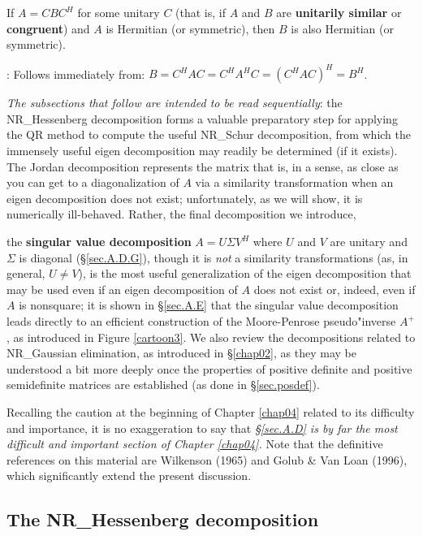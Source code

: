 \begin{fact} \label{fact.A.D.B}
If $A=CBC^{H}$ for some unitary $C$ (that is,
if $A$ and $B$ are {\bf unitarily similar} or {\bf congruent}) and $A$ is Hermitian (or
symmetric), then $B$ is also Hermitian (or symmetric).
\end{fact}

\/: Follows immediately from:
$B=C^{H}A C=C^{H}A^{H} C=(C^{H}A C)^{H}=B^{H}$. \endproof \medskip

{\it The subsections that follow are intended to be read sequentially}: the NR_Hessenberg
decomposition forms a valuable preparatory step for applying the QR
method to compute the useful NR_Schur decomposition, from which the immensely useful
eigen decomposition may readily be determined (if it exists).  The Jordan decomposition
represents the matrix that is, in a sense, as close as you can get to a diagonalization of $A$
via a similarity transformation when an eigen decomposition does not exist; unfortunately, as we will
show, it is numerically ill-behaved.  Rather, the final decomposition we introduce, 
\beginmylistb
\item the {\bf singular value decomposition} $A=U \Sigma V^H$ where $U$ and $V$ are unitary and $\Sigma$ is diagonal (\S \ref{sec.A.D.G}),
\endmylist
though it is {\it not} a similarity transformations (as, in general, $U\ne V$), is the most useful
generalization of the eigen decomposition that may be used even
if an eigen decomposition of $A$ does not exist or, indeed, even if $A$ is nonsquare;
it is shown in \S \ref{sec.A.E} that the singular value decomposition leads directly
to an efficient construction of the Moore-Penrose pseudo"inverse $A^+$, as introduced in Figure \ref{cartoon3}.
We also review the decompositions related to NR_Gaussian elimination, as introduced in \S \ref{chap02}, as they may
be understood a bit more deeply once the properties of positive definite and positive semidefinite
matrices are established (as done in \S \ref{sec.posdef}).  

Recalling the caution at the beginning of Chapter \ref{chap04} related to its difficulty and importance, it is no exaggeration to say that
{\it \S \ref{sec.A.D} is by far the most difficult and important section of Chapter \ref{chap04}.}  Note that the definitive references on this material
are Wilkenson (1965) and Golub \& Van Loan (1996), which significantly extend the present discussion.

\clearpage

\subsection{The NR_Hessenberg decomposition}\label{sec.A.D.A}

